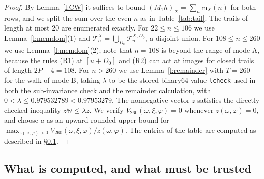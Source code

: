 \begin{proof}
By Lemma~\ref{l:CW} it suffices to bound $(M_1 h)_X = \sum_n \mathsf m_X(n)$ for both rows, and we split the sum over the even $n$ as in Table~\ref{tab:tail}. The trails of length at most $20$ are enumerated exactly. For $22 \le n \le 106$ we use Lemma~\ref{l:memdom}(1) and $\mathcal T^X_n = \bigcup_{D_0} \mathcal T^{X, D_0}_n$, a disjoint union. For $108 \le n \le 260$ we use Lemma~\ref{l:memdom}(2); note that $n = 108$ is beyond the range of mode A, because the rules (R1) at $[u + D_0]$ and (R2) can act at images for closed trails of length $2P - 4 = 108$. For $n>260$ we use Lemma~\ref{l:remainder} with $T=260$ for the walk of mode B, taking $\lambda$ to be the stored binary64 value \texttt{lcheck} used in both the sub-invariance check and the remainder calculation, with $0<\lambda\le0.979532789<0.97953279$.
The nonnegative vector $z$ satisfies the directly checked inequality $z\mathbb W\le\lambda z$.
We verify $V_{260}(\omega,\xi,\varphi)=0$ whenever $z(\omega,\varphi)=0$, and choose $a$ as an upward-rounded upper bound for
$\max_{z(\omega,\varphi)>0}V_{260}(\omega,\xi,\varphi)/z(\omega,\varphi)$. The entries of the table are computed as described in \S\ref{s:tailtrust}.
\end{proof}

\subsection{What is computed, and what must be trusted}\label{s:tailtrust}

